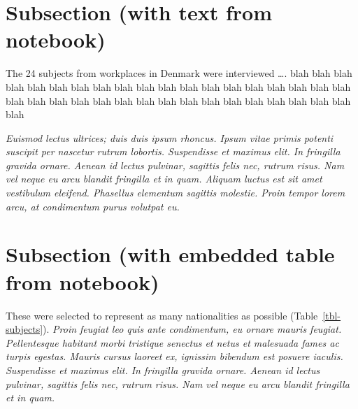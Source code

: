 \documentclass[
  a4paper,
]{scrbook}
\begin{document}
\section{Subsection (with text from
notebook)}\label{subsection-with-text-from-notebook}

\label{doc-sampling}
The 24 subjects from workplaces in Denmark were interviewed \ldots. blah
blah blah blah blah blah blah blah blah blah blah blah blah blah blah
blah blah blah blah blah blah blah blah blah blah blah blah blah blah
blah blah blah blah blah blah blah

\emph{Euismod lectus ultrices; duis duis ipsum rhoncus. Ipsum vitae
primis potenti suscipit per nascetur rutrum lobortis. Suspendisse et
maximus elit. In fringilla gravida ornare. Aenean id lectus pulvinar,
sagittis felis nec, rutrum risus. Nam vel neque eu arcu blandit
fringilla et in quam. Aliquam luctus est sit amet vestibulum eleifend.
Phasellus elementum sagittis molestie. Proin tempor lorem arcu, at
condimentum purus volutpat eu.}

\section{Subsection (with embedded table from
notebook)}\label{subsection-with-embedded-table-from-notebook}

These were selected to represent as many nationalities as possible
(Table~\ref{tbl-subjects}). \emph{Proin feugiat leo quis ante
condimentum, eu ornare mauris feugiat. Pellentesque habitant morbi
tristique senectus et netus et malesuada fames ac turpis egestas. Mauris
cursus laoreet ex, ignissim bibendum est posuere iaculis. Suspendisse et
maximus elit. In fringilla gravida ornare. Aenean id lectus pulvinar,
sagittis felis nec, rutrum risus. Nam vel neque eu arcu blandit
fringilla et in quam.}
\end{document}
